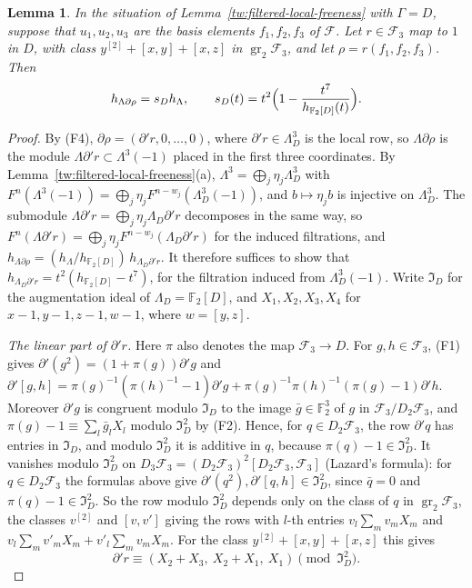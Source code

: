 \documentclass[11pt]{amsart}
\numberwithin{equation}{section}
\newtheorem{lemma}[equation]{Lemma}
\theoremstyle{definition}
\theoremstyle{remark}
\newcommand{\Ftwo}{\mathbb F_2}
\begin{document}
\begin{lemma}\label{tw:local-fox}
In the situation of Lemma~\ref{tw:filtered-local-freeness} with $\Gamma=D$,
suppose that $u_1,u_2,u_3$ are the basis elements $f_1,f_2,f_3$ of
$\mathcal F$. Let $r\in\mathcal F_3$ map to $1$ in $D$, with class
$y^{[2]}+[x,y]+[x,z]$ in $\operatorname{gr}_2\mathcal F_3$, and let
$\rho=r(f_1,f_2,f_3)$. Then
\[
 h_{\Lambda\partial\rho}=s_Dh_\Lambda,\qquad
 s_D(t)=t^2\Bigl(1-\frac{t^7}{h_{\Ftwo[D]}(t)}\Bigr).
\]
\end{lemma}

\begin{proof}
By (F4), $\partial\rho=(\partial'r,0,\dots,0)$, where
$\partial'r\in\Lambda_D^3$ is the local row, so $\Lambda\partial\rho$ is the
module $\Lambda\partial'r\subset\Lambda^3(-1)$ placed in the first three
coordinates. By Lemma~\ref{tw:filtered-local-freeness}(a),
$\Lambda^3=\bigoplus_j\eta_j\Lambda_D^3$ with
$F^n(\Lambda^3(-1))=\bigoplus_j\eta_jF^{n-w_j}(\Lambda_D^3(-1))$, and
$b\mapsto\eta_jb$ is injective on $\Lambda_D^3$. The submodule
$\Lambda\partial'r=\bigoplus_j\eta_j\Lambda_D\partial'r$ decomposes in the
same way, so
$F^n(\Lambda\partial'r)=\bigoplus_j\eta_jF^{n-w_j}(\Lambda_D\partial'r)$ for
the induced filtrations, and
$h_{\Lambda\partial\rho}=(h_\Lambda/h_{\Ftwo[D]})\,h_{\Lambda_D\partial'r}$. It
therefore suffices to show that $h_{\Lambda_D\partial'r}=t^2(h_{\Ftwo[D]}-t^7)$, for
the filtration induced from $\Lambda_D^3(-1)$. Write $\mathfrak I_D$ for the augmentation ideal of
$\Lambda_D=\Ftwo[D]$, and $X_1,X_2,X_3,X_4$ for $x-1,y-1,z-1,w-1$, where
$w=[y,z]$.

\emph{The linear part of $\partial'r$.} Here $\pi$ also denotes the map
$\mathcal F_3\to D$. For $g,h\in\mathcal F_3$, (F1) gives
$\partial'(g^2)=(1+\pi(g))\partial'g$ and
$\partial'[g,h]=\pi(g)^{-1}(\pi(h)^{-1}-1)\partial'g+\pi(g)^{-1}\pi(h)^{-1}(\pi(g)-1)\partial'h$.
Moreover $\partial'g$ is congruent modulo $\mathfrak I_D$ to the image
$\bar g\in\Ftwo^3$ of $g$ in $\mathcal F_3/D_2\mathcal F_3$, and
$\pi(g)-1\equiv\sum_l\bar g_lX_l$ modulo $\mathfrak I_D^2$ by (F2). Hence, for
$q\in D_2\mathcal F_3$, the row $\partial'q$ has entries in $\mathfrak I_D$,
and modulo $\mathfrak I_D^2$ it is additive in $q$, because
$\pi(q)-1\in\mathfrak I_D^2$. It vanishes modulo $\mathfrak I_D^2$ on
$D_3\mathcal F_3=(D_2\mathcal F_3)^2[D_2\mathcal F_3,\mathcal F_3]$ (Lazard's
formula): for $q\in D_2\mathcal F_3$ the formulas above give
$\partial'(q^2),\partial'[q,h]\in\mathfrak I_D^2$, since $\bar q=0$ and
$\pi(q)-1\in\mathfrak I_D^2$. So the row modulo $\mathfrak I_D^2$ depends
only on the class of $q$ in $\operatorname{gr}_2\mathcal F_3$, the classes
$v^{[2]}$ and $[v,v']$ giving the rows with $l$-th entries $v_l\sum_mv_mX_m$
and $v_l\sum_mv'_mX_m+v'_l\sum_mv_mX_m$.
For the class $y^{[2]}+[x,y]+[x,z]$ this gives
\[
 \partial'r\equiv(X_2+X_3,\ X_2+X_1,\ X_1)\pmod{\mathfrak I_D^2}.
\]


\end{proof}
\end{document}
